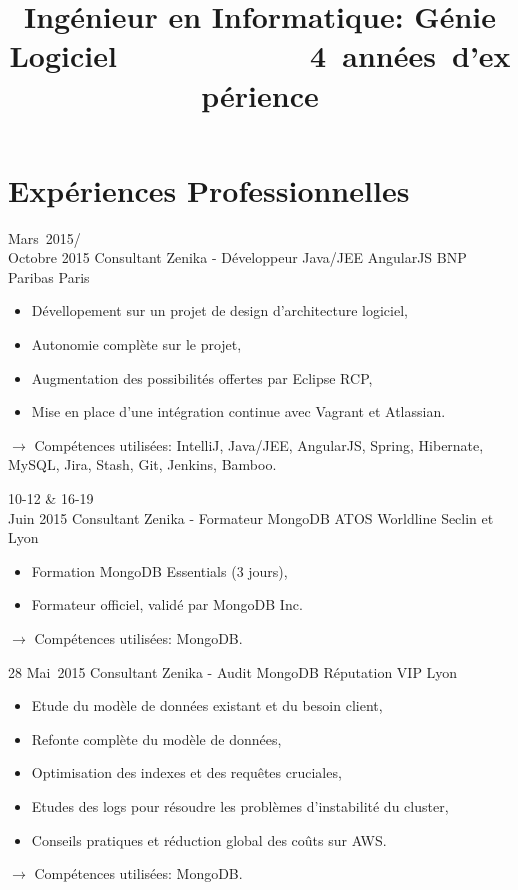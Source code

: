 \documentclass[11pt,a4paper]{moderncv}
\title{Ingénieur en Informatique: Génie Logiciel\newline\mbox{~~~~~~~~~~~~4 années d'expérience}} %
\begin{document}
\maketitle

\section{Expériences Professionnelles}

\cventry
{Mars\ 2015/\\Octobre 2015}
{Consultant Zenika - Développeur Java/JEE AngularJS}
{BNP Paribas}
{Paris}
{}
{\begin{itemize}
\item Dévellopement sur un projet de design d'architecture logiciel,
\item Autonomie complète sur le projet, 
\item Augmentation des possibilités offertes par Eclipse RCP,
\item Mise en place d'une intégration continue avec Vagrant et Atlassian.
\end{itemize}
$\rightarrow$ Compétences utilisées: IntelliJ, Java/JEE, AngularJS, Spring, Hibernate, MySQL, Jira, Stash, Git, Jenkins, Bamboo.
}   %

\cventry
{10-12 \& 16-19\\ Juin 2015}
{Consultant Zenika - Formateur MongoDB}
{ATOS Worldline}
{Seclin et Lyon}
{}
{\begin{itemize}
\item Formation MongoDB Essentials (3 jours),
\item Formateur officiel, validé par MongoDB Inc.
\end{itemize}
$\rightarrow$ Compétences utilisées: MongoDB.
}   %

\cventry
{28 Mai\ 2015}
{Consultant Zenika - Audit MongoDB}
{Réputation VIP}
{Lyon}
{}
{\begin{itemize}
\item Etude du modèle de données existant et du besoin client,
\item Refonte complète du modèle de données,
\item Optimisation des indexes et des requêtes cruciales,
\item Etudes des logs pour résoudre les problèmes d'instabilité du cluster,
\item Conseils pratiques et réduction global des coûts sur AWS.
\end{itemize}
$\rightarrow$ Compétences utilisées: MongoDB.
}   %
\end{document}
